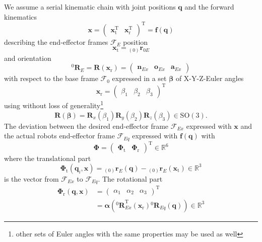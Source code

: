 \documentclass[twocolumn,10pt]{IFTOMM}
\newcommand{\bm}[1]{\boldsymbol{#1}}
\newcommand{\ortvek}[4]{{ }_{(#1)}{\boldsymbol{#2}}^{#3}_{#4} }
\newcommand{\vek}[3]{\boldsymbol{#1}^{#2}_{#3}}
\newcommand{\rotmat}[2]{{{ }^{#1}\boldsymbol{R}}_{#2}}
\newcommand{\transp}[0]{{\mathrm{T}}}
\newcommand{\ks}[1]{{\mathcal{F}}_{#1}}
\begin{document}
We assume a serial kinematic chain with joint positions $\bm{q}$ and the forward kinematics
%
\begin{equation}
\bm{x}
=
\begin{pmatrix}
\bm{x}_{\mathrm{t}}^\transp & \bm{x}_{\mathrm{r}}^\transp
\end{pmatrix}^\transp
=
\bm{f} (\bm{q})
\end{equation}  
%
describing the end-effector frames $\ks{E}$ position 
%
\begin{equation}
\bm{x}_{\mathrm{t}}
=
\ortvek{0}{r}{}{0E}
\label{equ:xt_def}
\end{equation}  
%
and orientation 
%
\begin{equation}
\rotmat{0}{E}=\bm{R}(\bm{x}_{\mathrm{r}})
=
\begin{pmatrix}\vek{n}{}{Ex} & \vek{o}{}{Ex} & \vek{a}{}{Ex}\end{pmatrix}
\end{equation}  
% 
with respect to the base frame $\ks{0}$ expressed in a set $\bm{\beta}$ of X-Y-Z-Euler angles
%
\begin{equation}
\bm{x}_{\mathrm{r}}
=
\begin{pmatrix}
\beta_1  & \beta_2 & \beta_3
\end{pmatrix}^{\mathrm{T}}
\label{equ:xr_def}
\end{equation} 
%
using without loss of generality\footnote{other sets of Euler angles with the same properties may be used as well}
%
\begin{equation}
\bm{R}(\bm{\beta}) = \bm{R}_x(\beta_1) \bm{R}_y(\beta_2) \bm{R}_z(\beta_3) \in \mathrm{SO(3)}.
\label{equ:def_rmat_xyz}
\end{equation}
%
The deviation between the desired end-effector frame $\ks{Ex}$ expressed with $\bm{x}$ and the actual robots end-effector frame $\ks{Eq}$ expressed with $\bm{f}(\bm{q})$ with 
%
\begin{equation}
\bm{\Phi}=\begin{pmatrix}
\bm{\Phi}_{\mathrm{t}} & \bm{\Phi}_{\mathrm{r}}
\end{pmatrix}^\transp \in {\mathbb{R}}^{6}
\end{equation}
%
where the translational part 
%
\begin{equation}
\bm{\Phi}_{\mathrm{t}}(\bm{q}_i,\bm{x}) = \ortvek{0}{r}{}{E}(\bm{q}) - \ortvek{0}{r}{}{E}(\bm{x}_{\mathrm{t}}) \in {\mathbb{R}}^{3}
\end{equation}
%
is the vector from $\ks{Ex}$ to $\ks{Eq}$.
The rotational part
%
\begin{align}
\bm{\Phi}_{\mathrm{r}}(\bm{q},\bm{x}) &= \begin{pmatrix}
\alpha_1  & \alpha_2 & \alpha_3
\end{pmatrix}^\transp  \\
&=\bm{\alpha}\left(\rotmat{0}{Ex}^\transp (\bm{x}_{\mathrm{r}})\rotmat{0}{Eq}(\bm{q})\right) \in {\mathbb{R}}^{3}
\end{align}
\end{document}
